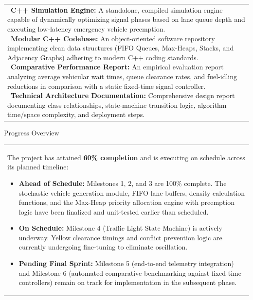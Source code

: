 \documentclass[12pt,a4paper]{article}
\newcommand{\sectiontitle}[1]{%
    {\color{GEUBlue}
    \fontsize{16.5}{20}\selectfont #1}
}
\newcommand{\instruction}[1]{%
    {\color{InstructionGrey}
    \fontsize{9.5}{12}\selectfont #1}
}
\newcommand{\answerbox}[2]{%
    \noindent
    \begin{tabularx}{\textwidth}{
        |>{\raggedright\arraybackslash}X|}
        \hline
        \parbox[t][#1][t]{\dimexpr\linewidth-12pt\relax}{
            \vspace{4pt}
            \fontsize{10}{13.5}\selectfont #2
        }\\
        \hline
    \end{tabularx}
}
\begin{document}
\answerbox{6.20cm}{\textbullet~\textbf{C++ Simulation Engine:} A standalone, compiled simulation engine capable of dynamically optimizing signal phases based on lane queue depth and executing low-latency emergency vehicle preemption.\\[4pt]
\textbullet~\textbf{Modular C++ Codebase:} An object-oriented software repository implementing clean data structures (FIFO Queues, Max-Heaps, Stacks, and Adjacency Graphs) adhering to modern C++ coding standards.\\[4pt]
\textbullet~\textbf{Comparative Performance Report:} An empirical evaluation report analyzing average vehicular wait times, queue clearance rates, and fuel-idling reductions in comparison with a static fixed-time signal controller.\\[4pt]
\textbullet~\textbf{Technical Architecture Documentation:} Comprehensive design report documenting class relationships, state-machine transition logic, algorithm time/space complexity, and deployment steps.}

\vspace{0.50cm}

\sectiontitle{Progress Overview}

\vspace{0.03cm}

\instruction{

}

\vspace{0.18cm}

\answerbox{7.20cm}{The project has attained \textbf{60\% completion} and is executing on schedule across its planned timeline:
\begin{itemize}\setlength{\itemsep}{3.5pt}\setlength{\parskip}{0pt}\setlength{\leftskip}{-8pt}
    \item \textbf{Ahead of Schedule:} Milestones 1, 2, and 3 are 100\% complete. The stochastic vehicle generation module, FIFO lane buffers, density calculation functions, and the Max-Heap priority allocation engine with preemption logic have been finalized and unit-tested earlier than scheduled.
    \item \textbf{On Schedule:} Milestone 4 (Traffic Light State Machine) is actively underway. Yellow clearance timings and conflict prevention logic are currently undergoing fine-tuning to eliminate oscillation.
    \item \textbf{Pending Final Sprint:} Milestone 5 (end-to-end telemetry integration) and Milestone 6 (automated comparative benchmarking against fixed-time controllers) remain on track for implementation in the subsequent phase.
\end{itemize}}
\end{document}
